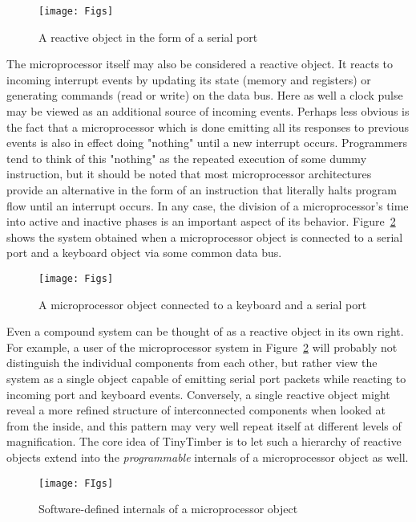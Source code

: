 \documentclass[12pt]{article}
\begin{document}
\begin{figure}
\texttt{[image: Figs]}
\caption{\label{fig:serial-port}A reactive object in the form of a serial port}
\end{figure}

The microprocessor itself may also be considered a reactive object.  It reacts to incoming interrupt events by updating its state (memory and registers) or generating commands (read or write) on the data bus.  Here as well a clock pulse may be viewed as an additional source of incoming events.  Perhaps less obvious is the fact that a microprocessor which is done emitting all its responses to previous events is also in effect doing "nothing" until a new interrupt occurs.  Programmers tend to think of this "nothing" as the repeated execution of some dummy instruction, but it should be noted that most microprocessor architectures provide an alternative in the form of an instruction that literally halts program flow until an interrupt occurs.  In any case, the division of a microprocessor's time into active and inactive phases is an important aspect of its behavior.  Figure~\ref{fig:cpu-system} shows the system obtained when a microprocessor object is connected to a serial port and a keyboard object via some common data bus.

\begin{figure}
\texttt{[image: Figs]}
\caption{\label{fig:cpu-system}A microprocessor object connected to a keyboard and a serial port}
\end{figure}

Even a compound system can be thought of as a reactive object in its own right.  For example, a user of the microprocessor system in Figure~\ref{fig:cpu-system} will probably not distinguish the individual components from each other, but rather view the system as a single object capable of emitting serial port packets while reacting to incoming port and keyboard events.  Conversely, a single reactive object might reveal a more refined structure of interconnected components when looked at from the inside, and this pattern may very well repeat itself at different levels of magnification.  The core idea of TinyTimber is to let such a hierarchy of reactive objects extend into the {\em programmable} internals of a microprocessor object as well.

\begin{figure}
\texttt{[image: FIgs]}
\caption{\label{fig:cpu-object}Software-defined internals of a microprocessor object}
\end{figure}
\end{document}
